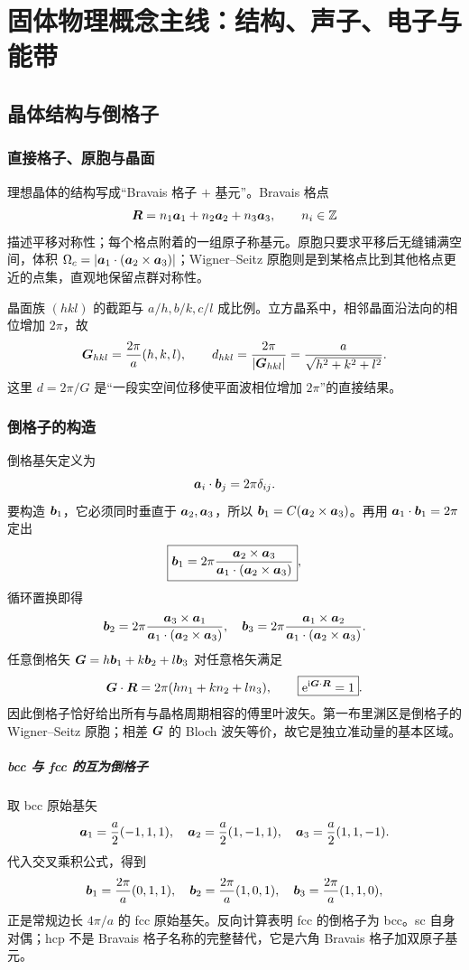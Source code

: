 \chapter{固体物理概念主线：结构、声子、电子与能带}

\section{晶体结构与倒格子}

\subsection{直接格子、原胞与晶面}
理想晶体的结构写成“Bravais 格子 $+$ 基元”。Bravais 格点
\[
\bm{R}=n_1\bm{a}_1+n_2\bm{a}_2+n_3\bm{a}_3,\qquad n_i\in\mathbb Z
\]
描述平移对称性；每个格点附着的一组原子称基元。原胞只要求平移后无缝铺满空间，体积
$\Omega_c=\left|\bm{a}_1\cdot(\bm{a}_2\times\bm{a}_3)\right|$；Wigner--Seitz 原胞则是到某格点比到其他格点更近的点集，直观地保留点群对称性。

晶面族 $(hkl)$ 的截距与 $a/h,b/k,c/l$ 成比例。立方晶系中，相邻晶面沿法向的相位增加 $2\pi$，故
\[
\bm{G}_{hkl}=\frac{2\pi}{a}(h,k,l),\qquad
d_{hkl}=\frac{2\pi}{\left|\bm{G}_{hkl}\right|}
=\frac{a}{\sqrt{h^2+k^2+l^2}}.
\]
这里 $d=2\pi/G$ 是“一段实空间位移使平面波相位增加 $2\pi$”的直接结果。

\subsection{倒格子的构造}
倒格基矢定义为
\[
\bm{a}_i\cdot\bm{b}_j=2\pi\delta_{ij}.
\]
要构造 $\bm{b}_1$，它必须同时垂直于 $\bm{a}_2,\bm{a}_3$，所以
$\bm{b}_1=C(\bm{a}_2\times\bm{a}_3)$。再用 $\bm{a}_1\cdot\bm{b}_1=2\pi$ 定出
\[
\boxed{\bm{b}_1=2\pi\frac{\bm{a}_2\times\bm{a}_3}
{\bm{a}_1\cdot(\bm{a}_2\times\bm{a}_3)}} ,
\]
循环置换即得
\[
\bm{b}_2=2\pi\frac{\bm{a}_3\times\bm{a}_1}{\bm{a}_1\cdot(\bm{a}_2\times\bm{a}_3)},\quad
\bm{b}_3=2\pi\frac{\bm{a}_1\times\bm{a}_2}{\bm{a}_1\cdot(\bm{a}_2\times\bm{a}_3)}.
\]
任意倒格矢 $\bm{G}=h\bm{b}_1+k\bm{b}_2+l\bm{b}_3$ 对任意格矢满足
\[
\bm{G}\cdot\bm{R}=2\pi(hn_1+kn_2+ln_3),\qquad
\boxed{\mathrm e^{\mathrm i\bm{G}\cdot\bm{R}}=1}.
\]
因此倒格子恰好给出所有与晶格周期相容的傅里叶波矢。第一布里渊区是倒格子的 Wigner--Seitz 原胞；相差 $\bm{G}$ 的 Bloch 波矢等价，故它是独立准动量的基本区域。

\paragraph{bcc 与 fcc 的互为倒格子}
取 bcc 原始基矢
\[
\bm{a}_1=\frac a2(-1,1,1),\quad \bm{a}_2=\frac a2(1,-1,1),\quad
\bm{a}_3=\frac a2(1,1,-1).
\]
代入交叉乘积公式，得到
\[
\bm{b}_1=\frac{2\pi}{a}(0,1,1),\quad
\bm{b}_2=\frac{2\pi}{a}(1,0,1),\quad
\bm{b}_3=\frac{2\pi}{a}(1,1,0),
\]
正是常规边长 $4\pi/a$ 的 fcc 原始基矢。反向计算表明 fcc 的倒格子为 bcc。sc 自身对偶；hcp 不是 Bravais 格子名称的完整替代，它是六角 Bravais 格子加双原子基元。

